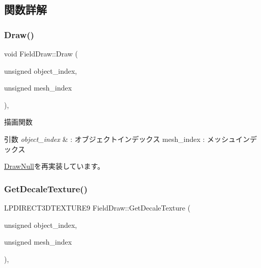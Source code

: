 \subsection{関数詳解}
\mbox{\label{class_field_draw_a1915497654d079074dbd3e058db06a78}} 
\subsubsection{\texorpdfstring{Draw()}{Draw()}}
{\footnotesize\ttfamily void Field\+Draw\+::\+Draw (\begin{DoxyParamCaption}\item[{unsigned}]{object\+\_\+index,  }\item[{unsigned}]{mesh\+\_\+index }\end{DoxyParamCaption})\hspace{0.3cm}{\ttfamily [override]}, {\ttfamily [virtual]}}



描画関数 


\begin{DoxyParams}{引数}
{\em object\+\_\+index} & \+: オブジェクトインデックス mesh\+\_\+index \+: メッシュインデックス \\
\hline
\end{DoxyParams}


\mbox{\hyperlink{class_draw_null_afe50f6fd820b18d673f70f048743f339}{Draw\+Null}}を再実装しています。

\mbox{\label{class_field_draw_a67eabcc5ffd6697b87e89a1c4ddb95f6}} 
\subsubsection{\texorpdfstring{Get\+Decale\+Texture()}{GetDecaleTexture()}}
{\footnotesize\ttfamily L\+P\+D\+I\+R\+E\+C\+T3\+D\+T\+E\+X\+T\+U\+R\+E9 Field\+Draw\+::\+Get\+Decale\+Texture (\begin{DoxyParamCaption}\item[{unsigned}]{object\+\_\+index,  }\item[{unsigned}]{mesh\+\_\+index }\end{DoxyParamCaption})\hspace{0.3cm}{\ttfamily [override]}, {\ttfamily [virtual]}}



